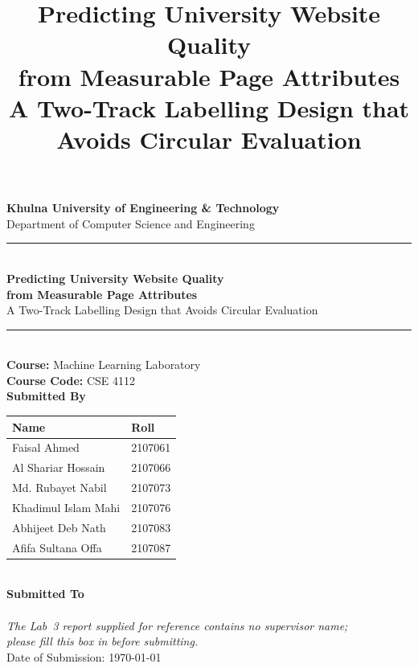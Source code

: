 \documentclass[11pt,a4paper]{article}
\title{\vspace{-1.2cm}\textbf{Predicting University Website Quality\\from Measurable Page Attributes}\\[4pt]
\large A Two-Track Labelling Design that Avoids Circular Evaluation}
\date{}
\begin{document}
\begin{titlepage}
\centering
\vspace*{1.2cm}

{\Large\bfseries Khulna University of Engineering \& Technology}\\[3pt]
{\large Department of Computer Science and Engineering}\\[1.6cm]

\rule{\textwidth}{1pt}\\[10pt]
{\LARGE\bfseries Predicting University Website Quality\\[6pt] from Measurable Page Attributes}\\[10pt]
{\large A Two-Track Labelling Design that Avoids Circular Evaluation}\\[8pt]
\rule{\textwidth}{1pt}\\[1.4cm]

{\large\bfseries Course:} Machine Learning Laboratory\\[2pt]
{\large\bfseries Course Code:} CSE 4112\\[1.6cm]

{\large\bfseries Submitted By}\\[8pt]
\begin{tabular}{ll}
\toprule
\textbf{Name} & \textbf{Roll} \\
\midrule
Faisal Ahmed          & 2107061 \\
Al Shariar Hossain    & 2107066 \\
Md. Rubayet Nabil     & 2107073 \\
Khadimul Islam Mahi   & 2107076 \\
Abhijeet Deb Nath     & 2107083 \\
Afifa Sultana Offa    & 2107087 \\
\bottomrule
\end{tabular}\\[1.4cm]

{\large\bfseries Submitted To}\\[6pt]
\\[4pt]
{\footnotesize\itshape The Lab~3 report supplied for reference contains no supervisor name;\\
please fill this box in before submitting.}\\[1.2cm]

\vfill
{\large Date of Submission: \today}
\end{titlepage}
\end{document}
